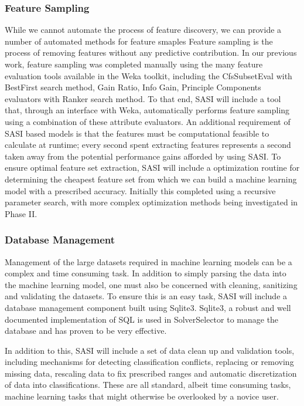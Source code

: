 \subsubsection{Feature Sampling} While we cannot automate the process of feature discovery, we can provide a number of automated methods for feature smaples Feature sampling is the process of removing features without any predictive contribution. In our previous work, feature sampling was completed manually using the many feature evaluation tools available in the Weka toolkit, including the CfsSubsetEval with BestFirst search method, Gain Ratio, Info Gain, Principle Components evaluators with Ranker search method. To that end, SASI will include a tool that, through an interface with Weka, automatically performs feature sampling using a combination of these attribute evaluators. 
An additional requirement of SASI based models is that the features must be computational feasible to calculate at runtime; every second spent extracting features represents a second taken away from the potential performance gains afforded by using SASI. To ensure optimal feature set extraction, SASI will include a optimization routine for determining the cheapest feature set from which we can build a machine learning model with a prescribed accuracy. Initially this completed using a recursive parameter search, with more complex optimization methods being investigated in Phase II. 
  
\subsubsection{Database Management} Management of the large datasets required in machine learning models can be a complex and time consuming task. In addition to simply parsing the data into the machine learning model, one must also be concerned with cleaning, sanitizing and validating the datasets. To ensure this is an easy task, SASI will include a database management component built using Sqlite3. Sqlite3, a robust and well documented implementation of SQL is used in SolverSelector to manage the database and has proven to be very effective. 
 
In addition to this, SASI will include a set of data clean up and validation tools, including mechanisms for detecting classification conflicts, replacing or removing missing data, rescaling data to fix prescribed ranges and automatic discretization of data into classifications. These are all standard, albeit time consuming tasks, machine learning tasks that might otherwise be overlooked by a novice user.
 
